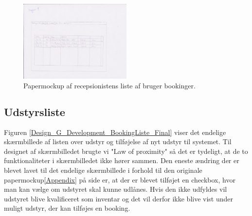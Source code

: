 {

\begin{figure}[h!]
  \centering
    \includegraphics[width=0.5\textwidth]{Appendix/GUI-Prototype/PaperMockup/GodkendBookinger_001}
  \caption{Papermockup af recepsionistens liste af bruger bookinger.}
\label{Design_G_Development_BookingListe}
\end{figure} 

\subsection{Udstyrsliste}
Figuren \ref{Design_G_Development_BookingListe_Final} viser det endelige skærmbillede af listen over udstyr og tilføjelse af nyt udstyr til systemet. Til designet af skærmbilledet brugte vi "Law of proximity" så det er tydeligt, at de to funktionaliteter i skærmbilledet ikke hører sammen. Den eneste ændring der er blevet lavet til det endelige skærmbillede  i forhold til den originale papermockup\ref{Appendix} på side \pageref{Appendix} er, at der er blevet tilføjet en checkbox, hvor man kan vælge om udstyret skal kunne udlånes. Hvis den ikke udfyldes vil udstyret blive kvalificeret som inventar og det vil derfor ikke blive vist under muligt udstyr, der kan tilføjes en booking. 

}
